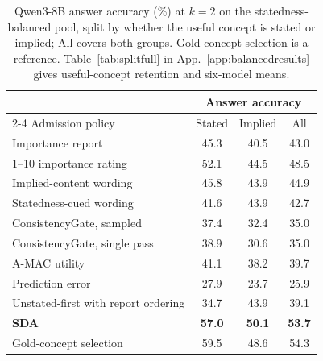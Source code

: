 \begin{table}[t]
\centering
\caption{Qwen3-8B answer accuracy (\%) at $k=2$ on the statedness-balanced pool, split by whether the useful concept is stated or implied; All covers both groups. Gold-concept selection is a reference. Table~\ref{tab:splitfull} in App.~\ref{app:balancedresults} gives useful-concept retention and six-model means.}
\label{tab:split}
\footnotesize
\setlength{\tabcolsep}{3pt}
\begin{tabular}{lccc}
\toprule
 & \multicolumn{3}{c}{Answer accuracy} \\
\cmidrule(lr){2-4}
Admission policy & Stated & Implied & All \\
\midrule
Importance report & 45.3 & 40.5 & 43.0 \\
1--10 importance rating & 52.1 & 44.5 & 48.5 \\
Implied-content wording & 45.8 & 43.9 & 44.9 \\
Statedness-cued wording & 41.6 & 43.9 & 42.7 \\
ConsistencyGate, sampled & 37.4 & 32.4 & 35.0 \\
ConsistencyGate, single pass & 38.9 & 30.6 & 35.0 \\
A-MAC utility & 41.1 & 38.2 & 39.7 \\
Prediction error & 27.9 & 23.7 & 25.9 \\
Unstated-first with report ordering & 34.7 & 43.9 & 39.1 \\
\textbf{SDA} & \textbf{57.0} & \textbf{50.1} & \textbf{53.7} \\
 Gold-concept selection & 59.5 & 48.6 & 54.3 \\
\bottomrule
\end{tabular}
\end{table}
